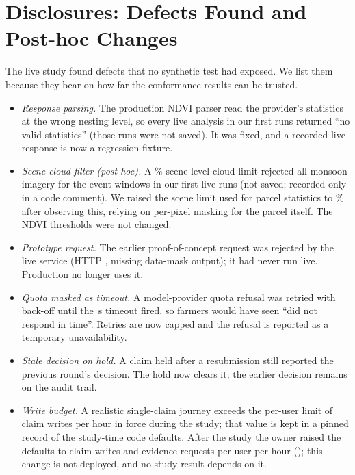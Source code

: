 \documentclass{ieeeaccess}
\begin{document}
\section{Disclosures: Defects Found and Post-hoc Changes}\label{sec:disclosures}
The live study found defects that no synthetic test had exposed. We list them because they bear on how far the conformance results can be trusted.
\begin{itemize}
\item \emph{Response parsing.} The production NDVI parser read the provider's statistics at the wrong nesting level, so every live analysis in our first runs returned ``no valid statistics'' (those runs were not saved). It was fixed, and a recorded live response is now a regression fixture.
\item \emph{Scene cloud filter (post-hoc).} A \SatSceneCloudMaxPercent\% scene-level cloud limit rejected all monsoon imagery for the event windows in our first live runs (not saved; recorded only in a code comment). We raised the scene limit used for parcel statistics to \SatProcessingSceneCloudMaxPercent\% after observing this, relying on per-pixel masking for the parcel itself. The NDVI thresholds were not changed.
\item \emph{Prototype request.} The earlier proof-of-concept request was rejected by the live service (HTTP \SatPocHttpStatus, missing data-mask output); it had never run live. Production no longer uses it.
\item \emph{Quota masked as timeout.} A model-provider quota refusal was retried with back-off until the \AiTimeoutSeconds\,s timeout fired, so farmers would have seen ``did not respond in time''. Retries are now capped and the refusal is reported as a temporary unavailability.
\item \emph{Stale decision on hold.} A claim held after a resubmission still reported the previous round's decision. The hold now clears it; the earlier decision remains on the audit trail.
\item \emph{Write budget.} A realistic single-claim journey exceeds the per-user limit of \ClaimWritesPerHourAtStudyWord{} claim writes per hour in force during the study; that value is kept in a pinned record of the study-time code defaults. After the study the owner raised the defaults to \ClaimWritesPerHourWord{} claim writes and \EvidenceRequestsPerHour{} evidence requests per user per hour (\PolicySafeAiDate{}); this change is not deployed, and no study result depends on it.
\end{itemize}
\end{document}
